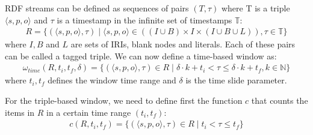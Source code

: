 %
%
%
RDF streams can be defined as sequences of pairs $(T,\tau)$ where T is a triple  $\langle s,p,o \rangle$ and $\tau$ is a timestamp in the infinite set of timestamps $\mathbb{T}$:
\begin{align*}
R = \{( \langle s,p,o \rangle, \tau) \mid \langle s,p,o \rangle \in ((I \cup B) \times I \times (I \cup B \cup L)  ), \tau \in \mathbb{T}\}
\end{align*}
where $I, B$ and $L$ are sets of IRIs, blank nodes and literals. Each of these pairs can be called a tagged triple. We can now define a time-based window as:
\begin{align*}
\omega_{time}(R,t_{i},t_{f},\delta)=\{ (\langle s,p,o \rangle,\tau) \in R \mid \delta \cdotp k + t_{i}<\tau \leq \delta\cdotp k + t_{f} , k \in \mathbb{N}\}
\end{align*}
%
where $t_i, t_f$ defines the window time range and $\delta$ is the time slide parameter.

For the triple-based window, we need to define first the function $c$ that counts the items in $R$ in a certain time range $(t_{i},t_{f})$:
\begin{align*}
c(R,t_{i},t_{f})=\{(\langle s,p,o \rangle,\tau) \in R \mid t_{i} < \tau \leq t_{f}\}
\end{align*}

